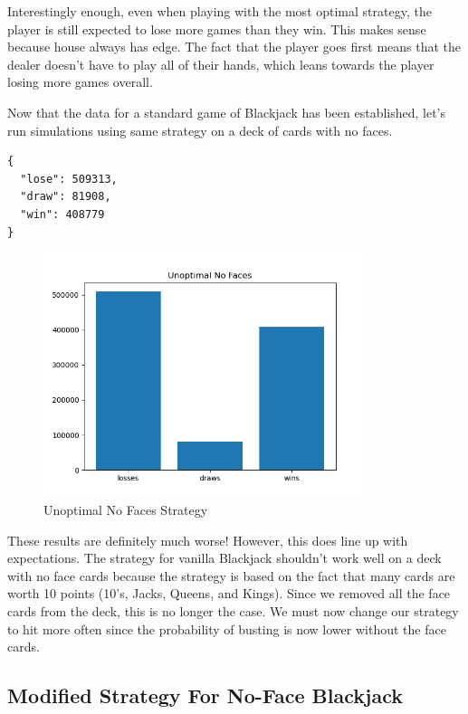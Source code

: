 \documentclass{article}
\begin{document}
{		Interestingly enough, even when playing with the most optimal strategy, the player is still expected to lose more games than they win.
		This makes sense because house always has edge. The fact that the player goes first means that the dealer doesn't have to
		play all of their hands, which leans towards the player losing more games overall.

		Now that the data for a standard game of Blackjack has been established, let's run simulations using same strategy on a deck of cards 
		with no faces.

        \begin{verbatim}
{
  "lose": 509313,
  "draw": 81908,
  "win": 408779
}
        \end{verbatim}
        
		\begin{figure}[H]
			\hypertarget{fig3}{}
			\begin{center}
				\includegraphics[width=9.5cm]{unoptimal-no-faces.png}
			\end{center}
			\vspace{-10mm}
			\caption{Unoptimal No Faces Strategy}
		\end{figure}

		These results are definitely much worse! However, this does line up with expectations. The strategy for vanilla Blackjack shouldn't 
		work well on a deck with no face cards because the strategy is based on the fact that many cards are worth 10 points (10's, Jacks, 
		Queens, and Kings). Since we removed all the face cards from the deck, this is no longer the case. We must now change our strategy to 
		hit more often since the probability of busting is now lower without the face cards.
        
        \subsection{Modified Strategy For No-Face Blackjack}
		\label{Modified Strategy For No-Face Blackjack}
        
}
\end{document}
